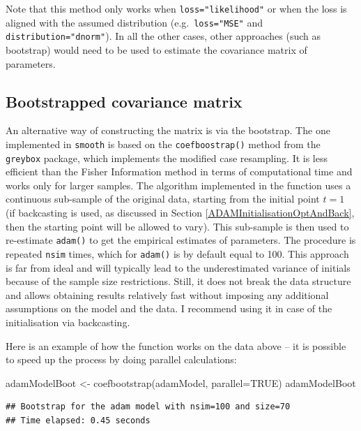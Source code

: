 \documentclass[
]{book}
\newenvironment{Shaded}{\begin{snugshade}}{\end{snugshade}}
\newcommand{\AttributeTok}[1]{\textcolor[rgb]{0.77,0.63,0.00}{#1}}
\newcommand{\ConstantTok}[1]{\textcolor[rgb]{0.00,0.00,0.00}{#1}}
\newcommand{\FunctionTok}[1]{\textcolor[rgb]{0.00,0.00,0.00}{#1}}
\newcommand{\NormalTok}[1]{#1}
\newcommand{\OtherTok}[1]{\textcolor[rgb]{0.56,0.35,0.01}{#1}}
\theoremstyle{definition}
\theoremstyle{definition}
\theoremstyle{definition}
\theoremstyle{definition}
\theoremstyle{remark}
\begin{document}
Note that this method only works when \texttt{loss="likelihood"} or when the loss is aligned with the assumed distribution (e.g.~\texttt{loss="MSE"} and \texttt{distribution="dnorm"}). In all the other cases, other approaches (such as bootstrap) would need to be used to estimate the covariance matrix of parameters.

\hypertarget{bootstrapped-covariance-matrix}{%
\subsection{Bootstrapped covariance matrix}\label{bootstrapped-covariance-matrix}}

An alternative way of constructing the matrix is via the bootstrap. The one implemented in \texttt{smooth} is based on the \texttt{coefboostrap()} method from the \texttt{greybox} package, which implements the modified case resampling. It is less efficient than the Fisher Information method in terms of computational time and works only for larger samples. The algorithm implemented in the function uses a continuous sub-sample of the original data, starting from the initial point \(t=1\) (if backcasting is used, as discussed in Section \ref{ADAMInitialisationOptAndBack}, then the starting point will be allowed to vary). This sub-sample is then used to re-estimate \texttt{adam()} to get the empirical estimates of parameters. The procedure is repeated \texttt{nsim} times, which for \texttt{adam()} is by default equal to 100. This approach is far from ideal and will typically lead to the underestimated variance of initials because of the sample size restrictions. Still, it does not break the data structure and allows obtaining results relatively fast without imposing any additional assumptions on the model and the data. I recommend using it in case of the initialisation via backcasting.

Here is an example of how the function works on the data above -- it is possible to speed up the process by doing parallel calculations:

\begin{Shaded}
\begin{Highlighting}[]
\NormalTok{adamModelBoot }\OtherTok{\textless{}{-}} \FunctionTok{coefbootstrap}\NormalTok{(adamModel, }\AttributeTok{parallel=}\ConstantTok{TRUE}\NormalTok{)}
\NormalTok{adamModelBoot}
\end{Highlighting}
\end{Shaded}

\begin{verbatim}
## Bootstrap for the adam model with nsim=100 and size=70
## Time elapsed: 0.45 seconds
\end{verbatim}
\end{document}
